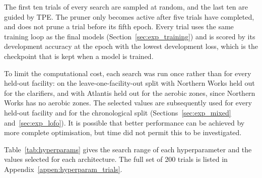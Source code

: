 The first ten trials of every search are sampled at random, and the last ten are guided by TPE. The pruner only becomes active after five trials have completed, and does not prune a trial before its fifth epoch. Every trial uses the same training loop as the final models (Section~\ref{sec:exp_training}) and is scored by its development accuracy at the epoch with the lowest development loss, which is the checkpoint that is kept when a model is trained.

To limit the computational cost, each search was run once rather than for every held-out facility: on the leave-one-facility-out split with Northern Works held out for the clarifiers, and with Atlantis held out for the aerobic zones, since Northern Works has no aerobic zones. The selected values are subsequently used for every held-out facility and for the chronological split (Sections~\ref{sec:exp_mixed} and~\ref{sec:exp_lofo}). It is possible that better performance can be achieved by more complete optimisation, but time did not permit this to be investigated. 

Table~\ref{tab:hyperparams} gives the search range of each hyperparameter and the values selected for each architecture. The full set of 200 trials is listed in Appendix~\ref{appen:hyperparam_trials}.


